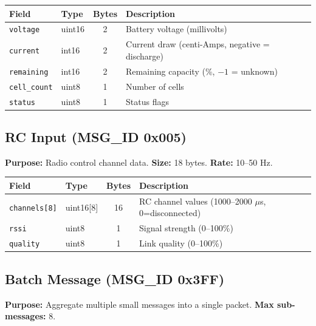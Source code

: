 \documentclass[11pt,a4paper]{article}
\begin{document}
\begin{table}[H]
\centering
\begin{tabular}{@{}llcl@{}}
\toprule
\textbf{Field} & \textbf{Type} & \textbf{Bytes} & \textbf{Description} \\
\midrule
\texttt{voltage}    & uint16 & 2 & Battery voltage (millivolts) \\
\texttt{current}    & int16  & 2 & Current draw (centi-Amps, negative = discharge) \\
\texttt{remaining}  & int16  & 2 & Remaining capacity (\%, $-1$ = unknown) \\
\texttt{cell\_count} & uint8  & 1 & Number of cells \\
\texttt{status}     & uint8  & 1 & Status flags \\
\bottomrule
\end{tabular}
\end{table}

\subsection{RC Input (MSG\_ID 0x005)}

\textbf{Purpose:} Radio control channel data. \textbf{Size:} 18 bytes. \textbf{Rate:} 10--50 Hz.

\begin{table}[H]
\centering
\begin{tabular}{@{}llcl@{}}
\toprule
\textbf{Field} & \textbf{Type} & \textbf{Bytes} & \textbf{Description} \\
\midrule
\texttt{channels[8]} & uint16[8] & 16 & RC channel values (1000--2000 $\mu$s, 0=disconnected) \\
\texttt{rssi}         & uint8     & 1  & Signal strength (0--100\%) \\
\texttt{quality}      & uint8     & 1  & Link quality (0--100\%) \\
\bottomrule
\end{tabular}
\end{table}

\subsection{Batch Message (MSG\_ID 0x3FF)}

\textbf{Purpose:} Aggregate multiple small messages into a single packet. \textbf{Max sub-messages:} 8.
\end{document}
